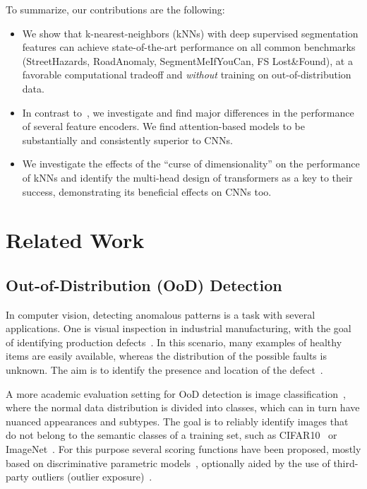 \documentclass[10pt,twocolumn,letterpaper]{article}
\begin{document}
To summarize, our contributions are the following:
\begin{itemize}
    \item We show that k-nearest-neighbors (kNNs) with deep supervised segmentation features can achieve state-of-the-art performance on all common benchmarks (StreetHazards, RoadAnomaly, SegmentMeIfYouCan, FS Lost\&Found), at a favorable computational tradeoff and \emph{without} training on out-of-distribution data.
    \item In contrast to~\cite{sun2022knnood}, we investigate and find major differences in the performance of several feature encoders. We find attention-based models to be substantially and consistently superior to CNNs.
    \item We investigate the effects of the ``curse of dimensionality'' on the performance of kNNs and identify the multi-head design of transformers as a key to their success, demonstrating its beneficial effects on CNNs too.
\end{itemize}










 \section{Related Work}

\subsection{Out-of-Distribution (OoD) Detection}
In computer vision, detecting anomalous patterns is a task with several applications. One is visual inspection in industrial manufacturing, with the goal of identifying production defects~\cite{mvtec,Zou2022}. In this scenario, many examples of healthy items are easily available, whereas the distribution of the possible faults is unknown. The aim is to identify the presence and location of the defect~\cite{SPADE, reiss2021panda, patchcore}. 

A more academic evaluation setting for OoD detection is image classification~\cite{hendrycks2021natural, zhang2020hybrid, yang2022openood}, where the normal data distribution is divided into classes, which can in turn have nuanced appearances and subtypes. The goal is to reliably identify images that do not belong to the semantic classes of a training set, such as CIFAR10~\cite{krizhevsky2009learning} or ImageNet~\cite{deng2009imagenet}. For this purpose several scoring functions have been proposed, mostly based on discriminative parametric models~\cite{mahalanobis, openhybrid, huang2021mos, sun2021react, huang2021on, haoqi2022vim, morteza2022provable}, optionally aided by the use of third-party outliers (outlier exposure)~\cite{hendrycks2018deep, NEURIPS2020_f5496252, pmlr-v162-ming22a, pmlr-v162-katz-samuels22a}.
\end{document}
